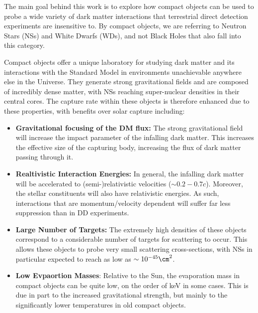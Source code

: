 The main goal behind this work is to explore how compact objects can be used to probe a wide variety of dark matter interactions that terrestrial direct detection experiments are insensitive to. By compact objects, we are referring to Neutron Stars (NSs) and White Dwarfs (WDs), and not Black Holes that also fall into this category.


Compact objects offer a unique laboratory for studying dark matter and its interactions with the Standard Model in environments unachievable anywhere else in the Universe. They generate strong gravitational fields and are composed of incredibly dense matter, with NSs reaching super-nuclear densities in their central cores. The capture rate within these objects is therefore enhanced due to these properties, with benefits over solar capture including:


\begin{itemize}
\item \textbf{Gravitational focusing of the DM flux:} The strong gravitational field will increase the impact parameter of the infalling dark matter. This increases the effective size of the capturing body, increasing the flux of dark matter passing through it. 

\item \textbf{Realtivistic Interaction Energies:} In general, the infalling dark matter will be accelerated to (semi-)relativistic velocities ($\sim 0.2 - 0.7 c$). Moreover, the stellar constituents will also have relativistic energies. As such, interactions that are momentum/velocity dependent will suffer far less suppression than in DD experiments. 

\item \textbf{Large Number of Targets:} The extremely high densities of these objects correspond to a considerable number of targets for scattering to occur. This allows these objects to probe very small scattering cross-sections, with NSs in particular expected to reach as low as $\sim 10^ {-45}\cm^2$. 

\item \textbf{Low Evpaortion Masses}: Relative to the Sun, the evaporation mass in compact objects can be quite low, on the order of keV in some cases. This is due in part to the increased gravitational strength, but mainly to the significantly lower temperatures in old compact objects. 
\end{itemize}

